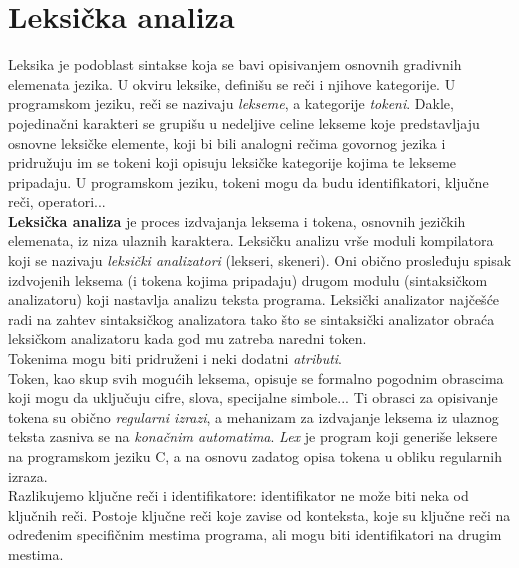 \documentclass[10pt]{extarticle}
\begin{document}
\section{Leksička analiza}
\noindent
Leksika je podoblast sintakse koja se bavi opisivanjem osnovnih gradivnih elemenata jezika. U okviru leksike, definišu se reči i njihove kategorije. U programskom jeziku, reči se nazivaju \textit{lekseme}, a kategorije \textit{tokeni}. Dakle, pojedinačni karakteri se grupišu u nedeljive celine lekseme koje predstavljaju osnovne leksičke elemente, koji bi bili analogni rečima govornog jezika i pridružuju im se tokeni koji opisuju leksičke kategorije kojima te lekseme pripadaju. U programskom jeziku, tokeni mogu da budu identifikatori, ključne reči, operatori... \\
\textbf{Leksička analiza} je proces izdvajanja leksema i tokena, osnovnih jezičkih elemenata, iz niza ulaznih karaktera. Leksičku analizu vrše moduli kompilatora koji se nazivaju \textit{leksički analizatori} (lekseri, skeneri). Oni obično prosleđuju spisak izdvojenih leksema (i tokena kojima pripadaju) drugom modulu (sintaksičkom analizatoru) koji nastavlja analizu
teksta programa. Leksički analizator najčešće radi na zahtev sintaksičkog analizatora tako što se sintaksički analizator obraća leksičkom analizatoru kada god mu zatreba naredni token. \\
Tokenima mogu biti pridruženi i neki dodatni \textit{atributi}. \\
Token, kao skup svih mogućih leksema, opisuje se formalno pogodnim obrascima koji mogu da uključuju cifre, slova, specijalne simbole... Ti obrasci za opisivanje tokena su obično \textit{regularni izrazi}, a mehanizam za izdvajanje leksema iz ulaznog teksta zasniva se na \textit{konačnim automatima}. 
\textit{Lex} je program koji generiše leksere na programskom jeziku C, a na osnovu zadatog opisa tokena u obliku regularnih izraza. \\
Razlikujemo ključne reči i identifikatore: identifikator ne može biti neka od ključnih reči. Postoje ključne reči koje zavise od konteksta, koje su ključne reči na određenim specifičnim mestima programa, ali mogu biti identifikatori na drugim mestima. 
\end{document}
